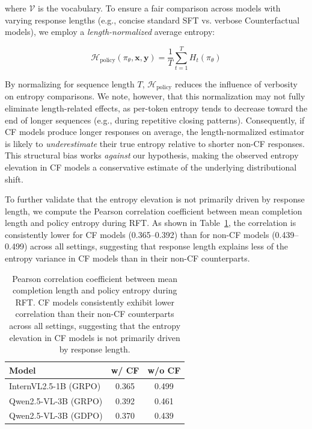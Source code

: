 \documentclass{article}
\begin{document}
where $\mathcal{V}$ is the vocabulary. To ensure a fair comparison across models with varying response lengths (e.g., concise standard SFT vs. verbose Counterfactual models), we employ a \textit{length-normalized} average entropy:

\begin{equation}
    \mathcal{H}_{\text{policy}}(\pi_\theta, \mathbf{x}, \mathbf{y}) = \frac{1}{T} \sum_{t=1}^{T} H_t(\pi_\theta)
    \label{eq:policy_entropy}
\end{equation}

By normalizing for sequence length $T$, $\mathcal{H}_{\text{policy}}$ reduces the influence of verbosity on entropy comparisons. We note, however, that this normalization may not fully eliminate length-related effects, as per-token entropy tends to decrease toward the end of longer sequences (e.g., during repetitive closing patterns). Consequently, if CF models produce longer responses on average, the length-normalized estimator is likely to \textit{underestimate} their true entropy relative to shorter non-CF responses. This structural bias works \textit{against} our hypothesis, making the observed entropy elevation in CF models a conservative estimate of the underlying distributional shift. 

To further validate that the entropy elevation is not primarily driven by response length, we compute the Pearson correlation coefficient between mean completion length and policy entropy during RFT. As shown in Table~\ref{tab:entropy_corr}, the correlation is consistently lower for CF models (0.365--0.392) than for non-CF models (0.439--0.499) across all settings, suggesting that response length explains less of the entropy variance in CF models than in their non-CF counterparts.
\begin{table}[h]
\centering
\begin{tabular}{lcc}
\toprule
\textbf{Model} & \textbf{w/ CF} & \textbf{w/o CF} \\
\midrule
InternVL2.5-1B (GRPO) & 0.365 & 0.499 \\
Qwen2.5-VL-3B (GRPO)  & 0.392 & 0.461 \\
Qwen2.5-VL-3B (GDPO)  & 0.370 & 0.439 \\
\bottomrule
\end{tabular}
\caption{Pearson correlation coefficient between mean completion length and policy entropy during RFT. CF models consistently exhibit lower correlation than their non-CF counterparts across all settings, suggesting that the entropy elevation in CF models is not primarily driven by response length.}
\label{tab:entropy_corr}
\end{table}
\end{document}
